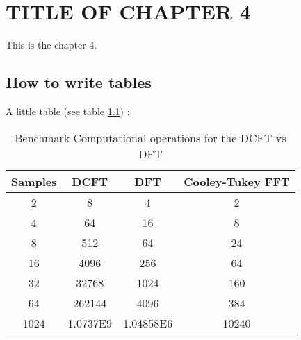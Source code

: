 ﻿%
\chapter{TITLE OF CHAPTER 4}  %

This is the chapter 4.

\section{How to write tables}

\begin{example}
A little table (see table \ref{products}) :


\begin{table}[ht]
\vspace{.2in}
\caption{Benchmark Computational operations for the DCFT vs DFT}
\begin{center}
	\begin{tabular}{|c|c|c|c|}
	  \hline
	 Samples & DCFT & DFT & Cooley-Tukey FFT \\
	  \hline
	  2 & 8 & 4 & 2 \\
	  4 & 64 & 16 & 8 \\
	  8 & 512 & 64 & 24 \\
	  16 & 4096 & 256 & 64 \\
	  32 & 32768 & 1024 & 160\\
	  64 & 262144 & 4096 & 384\\
	  1024 & 1.0737E9 & 1.04858E6 & 10240 \\
	 \hline
	\end{tabular}\label{products}
	\end{center}
\end{table}

\end{example}